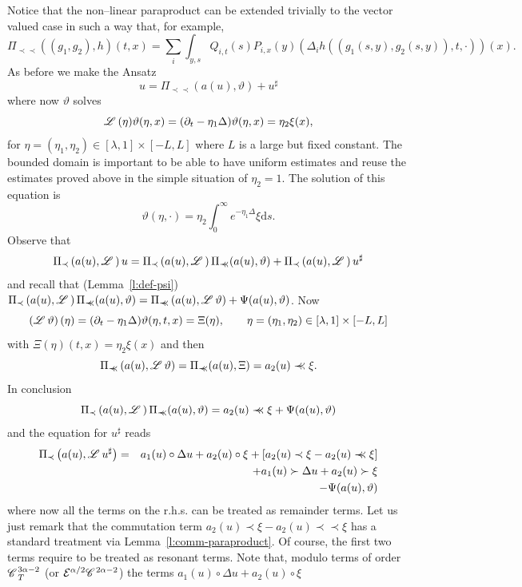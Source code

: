 \documentclass[11pt,reqno]{amsart}
\newcommand{\mathd}{\mathrm{d}}
\newcommand{\precprec}{\prec\!\!\!\prec}
\newcommand{\CC}{\mathscr{C} \hspace{.1em}}
\newcommand{\LL}{\mathscr{L} \hspace{.2em}}
\begin{document}
Notice that the non--linear paraproduct can be extended trivially to the
vector valued case in such a way that, for example,
\[ \Pi_{\precprec} ((g_1, g_2), h) (t, x) = \sum_i \int_{y, s} Q_{i, t} (s)
   P_{i, x} (y) (\Delta_i h ((g_1 (s, y), g_2 (s, y)), t, \cdot)) (x) . \]
As before we make the Ansatz
\[ u = \Pi_{\precprec} (a (u), \vartheta) + u^{\sharp} \]
where now $\vartheta$ solves
\[ \LL (\eta) \vartheta (\eta, x) = (\partial_t - \eta_1 \Delta) \vartheta
   (\eta, x) = \eta_2 \xi (x), \]
for $\eta = (\eta_1, \eta_2) \in [\lambda, 1] \times [- L, L]$ where $L$ is a
large but fixed constant. The bounded domain is important to be able to have
uniform estimates and reuse the estimates proved above in the simple situation
of $\eta_2 = 1$. The solution of this equation is
\[ \vartheta (\eta, \cdot) = \eta_2 \int_0^{\infty} e^{- \eta_1 \Delta} \xi
   \mathd s. \]
Observe that
\[ \Pi_{\prec} \left( a (u), \LL \right) u = \Pi_{\prec} \left( a (u), \LL
   \right) \Pi_{\precprec} (a (u), \vartheta) + \Pi_{\prec} \left( a (u), \LL
   \right) u^{\sharp} \]
and recall that (Lemma~\ref{l:def-psi}) $\Pi_{\prec} \left( a (u), \LL \right)
\Pi_{\precprec} (a (u), \vartheta) = \Pi_{\precprec} \left( a (u), \LL
\vartheta \right) + \Psi (a (u), \vartheta)$. Now
\[ \left( \LL \vartheta \right) (\eta) = (\partial_t - \eta_1 \Delta)
   \vartheta (\eta, t, x) = \Xi (\eta), \qquad \eta = (\eta_1, \eta_2) \in
   [\lambda, 1] \times [- L, L] \]
with $\Xi (\eta) (t, x) = \eta_2 \xi (x)$ and then
\[ \Pi_{\precprec} \left( a (u), \LL \vartheta \right) = \Pi_{\precprec} (a
   (u), \Xi) = a_2 (u) \precprec \xi . \]
In conclusion
\[ \Pi_{\prec} \left( a (u), \LL \right) \Pi_{\precprec} (a (u), \vartheta) =
   a_2 (u) \precprec \xi + \Psi (a (u), \vartheta) \]
and the equation for $u^{\sharp}$ reads
\begin{eqnarray}
  \Pi_{\prec} \left( a (u), \LL u^{\sharp} \right) & = & a_1 (u) \circ \Delta
  u + a_2 (u) \circ \xi + [a_2 (u) \prec \xi - a_2 (u) \precprec \xi]
  \nonumber\\
  &  & + a_1 (u) \succ \Delta u + a_2 (u) \succ \xi \nonumber\\
  &  & - \Psi (a (u), \vartheta) \nonumber
\end{eqnarray}
where now all the terms on the r.h.s. can be treated as remainder terms. Let
us just remark that the commutation term $a_2 (u) \prec \xi - a_2 (u)
\precprec \xi$ has a standard treatment via Lemma~\ref{l:comm-paraproduct}. Of
course, the first two terms require to be treated as resonant terms. Note
that, modulo terms of order $\CC^{3 \alpha - 2}_T$ (or $\mathcal{E}^{\alpha /
2} \CC^{2 \alpha - 2}$) the terms $a_1 (u) \circ \Delta u + a_2 (u) \circ \xi$
\end{document}
